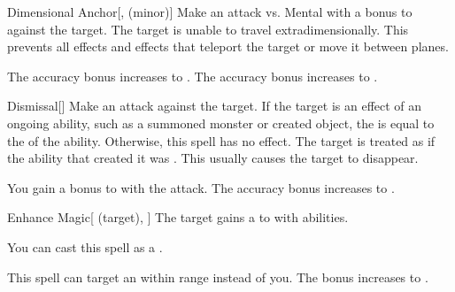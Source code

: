 \lowercase{\hypertarget{spell:Dimensional Anchor}{}}\label{spell:Dimensional Anchor}
\begin{freeability}[Rank 3]{\hypertarget{spell:Dimensional Anchor}{Dimensional Anchor}}[,  (minor)]
Make an attack vs. Mental with a  bonus to  against the target.
\hit The target is unable to travel extradimensionally.
This prevents all  effects and effects that teleport the target or move it between planes.

\rankline
{} The accuracy bonus increases to .
 The accuracy bonus increases to .

\end{freeability}
\vspace{0.25em}



\lowercase{\hypertarget{spell:Dismissal}{}}\label{spell:Dismissal}
\begin{freeability}[Rank 3]{\hypertarget{spell:Dismissal}{Dismissal}}[]
Make an attack against the target.
If the target is an effect of an ongoing  ability, such as a summoned monster or created object, the  is equal to the  of the ability.
Otherwise, this spell has no effect.
\hit The target is treated as if the ability that created it was .
This usually causes the target to disappear.

\rankline
{} You gain a  bonus to  with the attack.
 The accuracy bonus increases to .

\end{freeability}
\vspace{0.25em}



\lowercase{\hypertarget{spell:Enhance Magic}{}}\label{spell:Enhance Magic}
\begin{attuneability}[Rank 3]{\hypertarget{spell:Enhance Magic}{Enhance Magic}}[ (target), ]
The target gains a   to  with  abilities.

You can cast this spell as a .

\rankline
{} This spell can target an  within \rngmed range instead of you.
 The bonus increases to .

\end{attuneability}
\vspace{0.25em}



